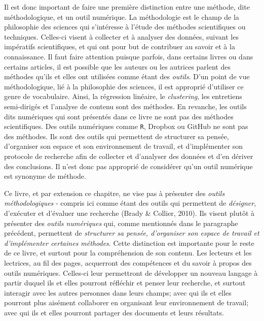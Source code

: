 \documentclass[
  letterpaper,
  DIV=11,
  numbers=noendperiod]{scrreprt}
\begin{document}
Il est donc important de faire une première distinction entre une
méthode, dite méthodologique, et un outil numérique. La méthodologie est
le champ de la philosophie des sciences qui s'intéresse à l'étude des
méthodes scientifiques ou techniques. Celles-ci visent à collecter et à
analyser des données, suivant les impératifs scientifiques, et qui ont
pour but de contribuer au savoir et à la connaissance. Il faut faire
attention puisque parfois, dans certains livres ou dans certains
articles, il est possible que les auteurs ou les autrices parlent des
méthodes qu'ils et elles ont utilisées comme étant des \emph{outils}.
D'un point de vue méthodologique, lié à la philosophie des sciences, il
est approprié d'utiliser ce genre de vocabulaire. Ainsi, la régression
linéaire, le \emph{clustering}, les entretiens semi-dirigés et l'analyse
de contenu sont des méthodes. En revanche, les outils dits numériques
qui sont présentés dans ce livre ne sont pas des méthodes scientifiques.
Des outils numériques comme \texttt{R}, Dropbox ou GitHub ne sont pas
des méthodes. Ils sont des outils qui permettent de structurer sa
pensée, d'organiser son espace et son environnement de travail, et
d'implémenter son protocole de recherche afin de collecter et d'analyser
des données et d'en dériver des conclusions. Il n'est donc pas approprié
de considérer qu'un outil numérique est synonyme de méthode.

Ce livre, et par extension ce chapitre, ne vise pas à présenter des
\emph{outils méthodologiques} - compris ici comme étant des outils qui
permettent de \emph{désigner}, d'exécuter et d'évaluer une recherche
(Brady \& Collier, 2010). Ils visent plutôt à présenter des \emph{outils
numériques} qui, comme mentionnés dans le paragraphe précédent,
permettent de \emph{structurer sa pensée, d'organiser son espace de
travail et d'implémenter certaines méthodes}. Cette distinction est
importante pour le reste de ce livre, et surtout pour la compréhension
de son contenu. Les lecteurs et les lectrices, au fil des pages,
acquerront des compétences et du savoir à propos des outils numériques.
Celles-ci leur permettront de développer un nouveau langage à partir
duquel ils et elles pourront réfléchir et penser leur recherche, et
surtout interagir avec les autres personnes dans leurs champs; avec qui
ils et elles pourront plus aisément collaborer en organisant leur
environnement de travail; avec qui ils et elles pourront partager des
documents et leurs résultats.
\end{document}
